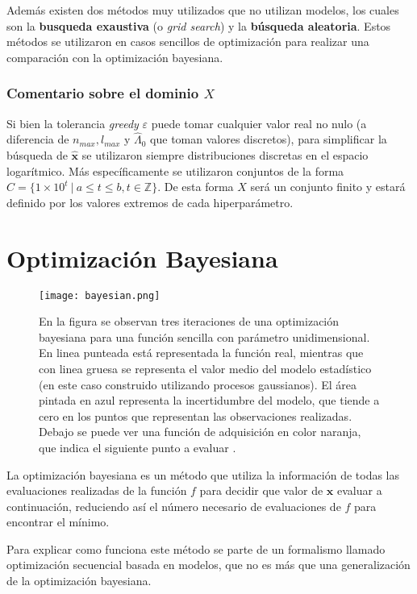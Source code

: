 Además existen dos métodos muy utilizados que no utilizan modelos, los cuales son la \textbf{busqueda exaustiva} (o \textit{grid search}) y la \textbf{búsqueda aleatoria}. Estos métodos se utilizaron en casos sencillos de optimización para realizar una comparación con la optimización bayesiana.


\subsubsection*{Comentario sobre el dominio $X$}


Si bien la tolerancia \textit{greedy} $\varepsilon$ puede tomar cualquier valor real no nulo (a diferencia de $n_{max}, l_{max}$ y $\hat{\Lambda}_0$ que toman valores discretos), para simplificar la búsqueda de $\hat{\textbf{x}}$ se utilizaron siempre distribuciones discretas en el espacio logarítmico. Más específicamente se utilizaron conjuntos de la forma $C = \{1\times 10^{t} \  | \ a \leq t \leq b,  t \in {\mathbb{Z}} \}$. De esta forma $X$ será un conjunto finito y estará definido por los valores extremos de cada hiperparámetro. 


\section{Optimización Bayesiana}

\begin{figure}[h!]
\centering
\texttt{[image: bayesian.png]}
\caption{En la figura se observan tres iteraciones de una optimización bayesiana para una función sencilla con parámetro unidimensional. En linea punteada está representada la función real, mientras que con linea gruesa se representa el valor medio del modelo estadístico (en este caso construido utilizando procesos gaussianos). El área pintada en azul representa la incertidumbre del modelo, que tiende a cero en los puntos que representan las observaciones realizadas. Debajo se puede ver una función de adquisición en color naranja, que indica el siguiente punto a evaluar \cite{Feurer2019}.}
\label{fig:bayesian}
\end{figure}

La optimización bayesiana es un método que utiliza la información de todas las evaluaciones realizadas de la función $f$ para decidir que valor de $\textbf{x}$ evaluar a continuación, reduciendo así el número necesario de evaluaciones de $f$ para encontrar el mínimo.

Para explicar como funciona este método se parte de un formalismo llamado optimización secuencial basada en modelos, que no es más que una generalización de la optimización bayesiana.


